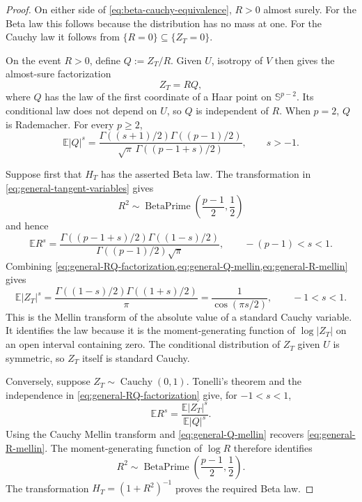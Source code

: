 \documentclass[11pt]{article}
\numberwithin{equation}{section}
\theoremstyle{thmstyleone}%
\theoremstyle{thmstyletwo}%
\let\cref\autoref
\newcommand{\E}{\mathbb E}
\newcommand{\sphere}{\mathbb S}
\newcommand{\BetaPrime}{\operatorname{BetaPrime}}
\newcommand{\Cauchy}{\operatorname{Cauchy}}
\begin{document}
\begin{proof}
On either side of \cref{eq:beta-cauchy-equivalence}, \(R>0\) almost surely.
For the Beta law this follows because the distribution has no mass at one.
For the Cauchy law it follows from
\(\{R=0\}\subseteq\{Z_T=0\}\).

On the event \(R>0\), define \(Q:=Z_T/R\).  Given \(U\), isotropy of \(V\)
then gives the almost-sure factorization
\begin{equation}
  Z_T=RQ,
  \label{eq:general-RQ-factorization}
\end{equation}
where \(Q\) has the law of the first coordinate of a Haar point on
\(\sphere^{p-2}\).  Its conditional law does not depend on \(U\), so \(Q\)
is independent of \(R\).  When \(p=2\), \(Q\) is Rademacher.  For every
\(p\geq2\),
\begin{equation}
  \E|Q|^s
  =
  \frac{
    \Gamma((s+1)/2)\Gamma((p-1)/2)
  }{
    \sqrt\pi\,\Gamma((p-1+s)/2)
  },
  \qquad s>-1.
  \label{eq:general-Q-mellin}
\end{equation}

Suppose first that \(H_T\) has the asserted Beta law.  The transformation in
\cref{eq:general-tangent-variables} gives
\[
  R^2\sim\BetaPrime\!\left(\frac{p-1}{2},\frac12\right)
\]
and hence
\begin{equation}
  \E R^s
  =
  \frac{
    \Gamma((p-1+s)/2)\Gamma((1-s)/2)
  }{
    \Gamma((p-1)/2)\sqrt\pi
  },
  \qquad -(p-1)<s<1.
  \label{eq:general-R-mellin}
\end{equation}
Combining
\cref{eq:general-RQ-factorization,eq:general-Q-mellin,eq:general-R-mellin}
gives
\[
  \E|Z_T|^s
  =
  \frac{
    \Gamma((1-s)/2)\Gamma((1+s)/2)
  }{\pi}
  =
  \frac{1}{\cos(\pi s/2)},
  \qquad -1<s<1.
\]
This is the Mellin transform of the absolute value of a standard Cauchy
variable.  It identifies the law because it is the moment-generating
function of \(\log|Z_T|\) on an open interval containing zero.  The
conditional distribution of \(Z_T\) given \(U\) is symmetric, so \(Z_T\)
itself is standard Cauchy.

Conversely, suppose \(Z_T\sim\Cauchy(0,1)\).  Tonelli's theorem and the
independence in \cref{eq:general-RQ-factorization} give, for
\(-1<s<1\),
\[
  \E R^s
  =
  \frac{\E|Z_T|^s}{\E|Q|^s}.
\]
Using the Cauchy Mellin transform and \cref{eq:general-Q-mellin} recovers
\cref{eq:general-R-mellin}.  The moment-generating function of \(\log R\)
therefore identifies
\[
  R^2\sim\BetaPrime\!\left(\frac{p-1}{2},\frac12\right).
\]
The transformation \(H_T=(1+R^2)^{-1}\) proves the required Beta law.
\end{proof}
\end{document}
